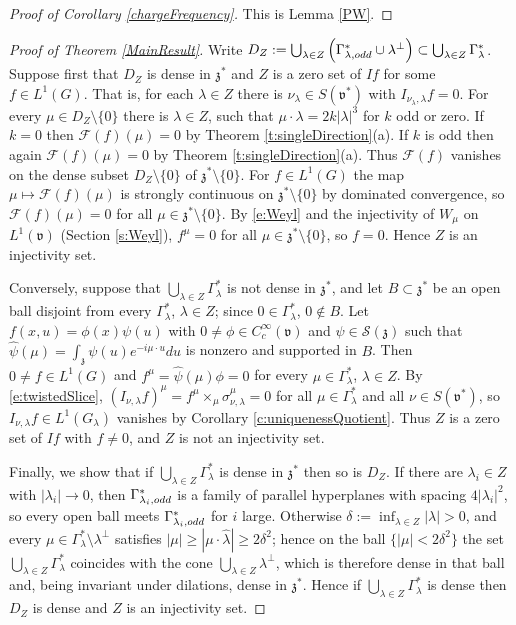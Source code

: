 \documentclass[11pt]{amsart}
\theoremstyle{plain}
\theoremstyle{definition}
\theoremstyle{remark}
\numberwithin{equation}{section}
\def\fz{\mathfrak{z}}
\def\fv{\mathfrak{v}}
\def\cF{\mathcal{F}}
\def\mz{\setminus\{0\}}
\numberwithin{equation}{section}
\begin{document}
\begin{proof}[Proof of Corollary \ref{chargeFrequency}]
	This is Lemma \ref{PW}.
\end{proof}
\begin{proof}[Proof of Theorem \ref{MainResult}]
	Write $D_Z:=\bigcup_{\lambda\in Z}\left(\Gamma_{\lambda, \rm odd}^*\cup \lambda^\perp\right)\subset\bigcup_{\lambda\in Z}\Gamma_\lambda^*$. Suppose first that $D_Z$ is dense in $\fz^*$ and $Z$ is a zero set of $If$ for some $f\in L^1(G)$. That is, for each $\lambda\in Z$ there is $\nu_\lambda\in S(\fv^*)$ with $I_{\nu_\lambda, \lambda}f=0$. For every $\mu\in D_Z\mz$ there is $\lambda\in Z$, such that $\mu\cdot\lambda=2k|\lambda|^3$ for $k$ odd or zero. If $k=0$ then $\cF(f)(\mu)=0$ by Theorem \ref{t:singleDirection}(a). If $k$ is odd then again $\cF(f)(\mu)=0$ by Theorem \ref{t:singleDirection}(a). Thus $\cF(f)$ vanishes on the dense subset $D_Z\mz$ of $\fz^*\mz$. For $f\in L^1(G)$ the map $\mu\mapsto\cF(f)(\mu)$ is strongly continuous on $\fz^*\mz$ by dominated convergence, so $\cF(f)(\mu)=0$ for all $\mu\in \fz^*\mz$. By \eqref{e:Weyl} and the injectivity of $W_\mu$ on $L^1(\fv)$ (Section \ref{s:Weyl}), $f^\mu=0$ for all $\mu\in \fz^*\mz$, so $f=0$. Hence $Z$ is an injectivity set.

	Conversely, suppose that $\bigcup_{\lambda\in Z}\Gamma_\lambda^*$ is not dense in $\fz^*$, and let $B\subset\fz^*$ be an open ball disjoint from every $\Gamma_\lambda^*$, $\lambda\in Z$; since $0\in \Gamma_\lambda^*$, $0\notin B$. Let $f(x, u)=\phi(x)\psi(u)$ with $0\neq\phi\in C_c^\infty(\fv)$ and $\psi\in \mathcal{S}(\fz)$ such that $\widehat{\psi}(\mu)=\int_\fz\psi(u)e^{-i\mu\cdot u}du$ is nonzero and supported in $B$. Then $0\neq f\in L^1(G)$ and $f^\mu=\widehat{\psi}(\mu)\phi=0$ for every $\mu\in \Gamma_\lambda^*$, $\lambda\in Z$. By \eqref{e:twistedSlice}, $(I_{\nu, \lambda}f)^\mu=f^\mu\times_\mu\sigma^\mu_{\nu, \lambda}=0$ for all $\mu\in \Gamma_\lambda^*$ and all $\nu\in S(\fv^*)$, so $I_{\nu, \lambda}f\in L^1(G_\lambda)$ vanishes by Corollary \ref{c:uniquenessQuotient}. Thus $Z$ is a zero set of $If$ with $f\neq0$, and $Z$ is not an injectivity set.

	Finally, we show that if $\bigcup_{\lambda\in Z}\Gamma_\lambda^*$ is dense in $\fz^*$ then so is $D_Z$. If there are $\lambda_i\in Z$ with $|\lambda_i|\to0$, then $\Gamma_{\lambda_i, \rm odd}^*$ is a family of parallel hyperplanes with spacing $4|\lambda_i|^2$, so every open ball meets $\Gamma_{\lambda_i, \rm odd}^*$ for $i$ large. Otherwise $\delta:=\inf_{\lambda\in Z}|\lambda|>0$, and every $\mu\in \Gamma_\lambda^*\setminus\lambda^\perp$ satisfies $|\mu|\geq|\mu\cdot\hat\lambda|\geq2\delta^2$; hence on the ball $\{|\mu|<2\delta^2\}$ the set $\bigcup_{\lambda\in Z}\Gamma_\lambda^*$ coincides with the cone $\bigcup_{\lambda\in Z}\lambda^\perp$, which is therefore dense in that ball and, being invariant under dilations, dense in $\fz^*$. Hence if $\bigcup_{\lambda\in Z}\Gamma_\lambda^*$ is dense then $D_Z$ is dense and $Z$ is an injectivity set.
\end{proof}
\end{document}
